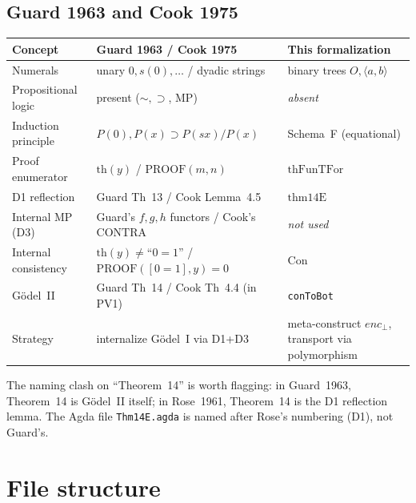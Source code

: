 \documentclass[11pt]{article}
\newcommand{\pair}[2]{\langle #1, #2 \rangle}
\newcommand{\thFunTFor}{\mathrm{thFunTFor}}
\begin{document}
\subsection*{Guard 1963 and Cook 1975}

\begin{center}
\begin{tabular}{lll}
\hline
\textbf{Concept} & \textbf{Guard 1963} / \textbf{Cook 1975} & \textbf{This formalization} \\
\hline
Numerals               & unary $0, s(0), \ldots$ / dyadic strings & binary trees $O, \pair{a}{b}$ \\
Propositional logic    & present ($\sim, \supset$, MP)            & \emph{absent} \\
Induction principle    & $P(0), P(x){\supset}P(sx)/P(x)$           & Schema~F (equational) \\
Proof enumerator       & $\mathrm{th}(y)$ / $\mathrm{PROOF}(m,n)$  & $\thFunTFor$ \\
D1 reflection          & Guard Th~13 / Cook Lemma~4.5              & $\mathrm{thm14E}$ \\
Internal MP (D3)       & Guard's $f,g,h$ functors / Cook's $\mathrm{CONTRA}$ & \emph{not used} \\
Internal consistency   & $\mathrm{th}(y) \neq \text{``}0{=}1\text{''}$ / $\mathrm{PROOF}([0{=}1],y)=0$ & $\mathrm{Con}$ \\
G\"odel~II             & Guard Th~14 / Cook Th~4.4 (in PV1)        & \texttt{conToBot} \\
Strategy               & internalize G\"odel~I via D1+D3           & meta-construct $\mathit{enc}_\bot$, transport via polymorphism \\
\hline
\end{tabular}
\end{center}

\noindent
The naming clash on ``Theorem~14'' is worth flagging:
in Guard~1963, Theorem~14 is G\"odel~II itself; in
Rose~1961, Theorem~14 is the D1 reflection lemma.
The Agda file \texttt{Thm14E.agda} is named after Rose's
numbering (D1), not Guard's.

\section{File structure}
\end{document}
